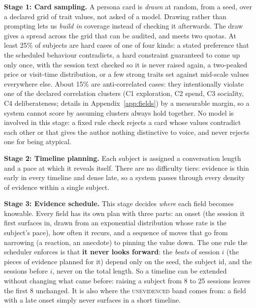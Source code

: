 \documentclass{article}
\begin{document}
\textbf{Stage 1: Card sampling.} A persona card is \emph{drawn} at random, from a seed, over a
declared grid of trait values, not asked of a model. Drawing rather than prompting lets us \emph{build
in} coverage instead of checking it afterwards. The draw gives a spread across the grid that can be
audited, and meets two quotas. At least 25\% of subjects are hard cases of one of four kinds: a
stated preference that the scheduled behaviour contradicts, a hard constraint guaranteed to come up
only once, with the session text checked so it is never raised again, a two-peaked price or visit-time distribution, or a few strong traits set against
mid-scale values everywhere else. About 15\% are anti-correlated cases: they intentionally violate one of the declared correlation
clusters (C1 exploration, C2 spend, C3 sociality, C4 deliberateness; details in Appendix~\ref{app:fields}) by a measurable
margin, so a system cannot score by assuming clusters always hold together. No model is involved in
this stage: a fixed rule check rejects a card whose values contradict each other or that gives the
author nothing distinctive to voice, and never rejects one for being atypical.

\textbf{Stage 2: Timeline planning.} Each subject is assigned a conversation length and a pace at
which it reveals itself. There are no difficulty tiers: evidence is thin early in every timeline and
dense late, so a system passes through every density of evidence within a single subject.

\textbf{Stage 3: Evidence schedule.} This stage decides \emph{where} each field becomes knowable.
Every field has its own plan with three parts: an onset (the session it first surfaces in, drawn from
an exponential distribution whose rate is the subject's pace), how often it recurs, and a sequence of
moves that go from narrowing (a reaction, an anecdote) to pinning the value down. The one rule the
scheduler enforces is that \textbf{it never looks forward}: the \emph{beats} of session $i$ (the pieces of evidence planned for it) depend only on the
seed, the subject id, and the sessions before $i$, never on the total length. So a timeline can be
extended without changing what came before: raising a subject from 8 to 25 sessions leaves the first
8 unchanged. It is also where the \textsc{unevidenced} band comes from: a field with a late onset
simply never surfaces in a short timeline.
\end{document}
